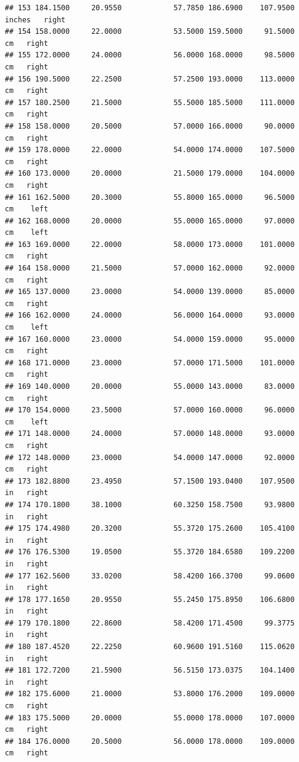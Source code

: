 \documentclass[]{article}
\begin{document}
\begin{verbatim}
## 153 184.1500     20.9550            57.7850 186.6900    107.9500 inches   right
## 154 158.0000     22.0000            53.5000 159.5000     91.5000     cm   right
## 155 172.0000     24.0000            56.0000 168.0000     98.5000     cm   right
## 156 190.5000     22.2500            57.2500 193.0000    113.0000     cm   right
## 157 180.2500     21.5000            55.5000 185.5000    111.0000     cm   right
## 158 158.0000     20.5000            57.0000 166.0000     90.0000     cm   right
## 159 178.0000     22.0000            54.0000 174.0000    107.5000     cm   right
## 160 173.0000     20.0000            21.5000 179.0000    104.0000     cm   right
## 161 162.5000     20.3000            55.8000 165.0000     96.5000     cm    left
## 162 168.0000     20.0000            55.0000 165.0000     97.0000     cm    left
## 163 169.0000     22.0000            58.0000 173.0000    101.0000     cm   right
## 164 158.0000     21.5000            57.0000 162.0000     92.0000     cm   right
## 165 137.0000     23.0000            54.0000 139.0000     85.0000     cm   right
## 166 162.0000     24.0000            56.0000 164.0000     93.0000     cm    left
## 167 160.0000     23.0000            54.0000 159.0000     95.0000     cm   right
## 168 171.0000     23.0000            57.0000 171.5000    101.0000     cm   right
## 169 140.0000     20.0000            55.0000 143.0000     83.0000     cm   right
## 170 154.0000     23.5000            57.0000 160.0000     96.0000     cm    left
## 171 148.0000     24.0000            57.0000 148.0000     93.0000     cm   right
## 172 148.0000     23.0000            54.0000 147.0000     92.0000     cm   right
## 173 182.8800     23.4950            57.1500 193.0400    107.9500     in   right
## 174 170.1800     38.1000            60.3250 158.7500     93.9800     in   right
## 175 174.4980     20.3200            55.3720 175.2600    105.4100     in   right
## 176 176.5300     19.0500            55.3720 184.6580    109.2200     in   right
## 177 162.5600     33.0200            58.4200 166.3700     99.0600     in   right
## 178 177.1650     20.9550            55.2450 175.8950    106.6800     in   right
## 179 170.1800     22.8600            58.4200 171.4500     99.3775     in   right
## 180 187.4520     22.2250            60.9600 191.5160    115.0620     in   right
## 181 172.7200     21.5900            56.5150 173.0375    104.1400     in   right
## 182 175.6000     21.0000            53.8000 176.2000    109.0000     cm   right
## 183 175.5000     20.0000            55.0000 178.0000    107.0000     cm   right
## 184 176.0000     20.5000            56.0000 178.0000    109.0000     cm   right

\end{verbatim}
\end{document}
